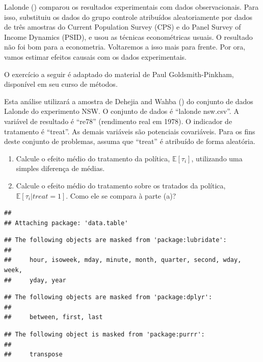 \documentclass[
]{article}
\begin{document}
Lalonde () comparou os resultados experimentais com dados observacionais. Para isso, substituiu os dados do grupo controle atribuídos aleatoriamente por dados de três amostras do Current Population Survey (CPS) e do Panel Survey of Income Dynamics (PSID), e usou as técnicas econométricas usuais. O resultado não foi bom para a econometria. Voltaremos a isso mais para frente. Por ora, vamos estimar efeitos causais com os dados experimentais.

O exercício a seguir é adaptado do material de Paul Goldsmith-Pinkham, disponível em seu curso de métodos.

Esta análise utilizará a amostra de Dehejia and Wahba () do conjunto de dados Lalonde do experimento NSW. O conjunto de dados é ``lalonde nsw.csv''. A variável de resultado é ``re78'' (rendimento real em 1978). O indicador de tratamento é ``treat''. As demais variáveis são potenciais covariáveis. Para os fins deste conjunto de problemas, assuma que ``treat'' é atribuído de forma aleatória.

\begin{enumerate}
\def\labelenumi{(\alph{enumi})}
\item
  Calcule o efeito médio do tratamento da política, \(\mathbb{E}[\tau_i]\), utilizando uma simples diferença de médias.
\item
  Calcule o efeito médio do tratamento sobre os tratados da política, \(\mathbb{E}[\tau_i|treat=1]\). Como ele se compara à parte (a)?
\end{enumerate}

\begin{verbatim}
## 
## Attaching package: 'data.table'
\end{verbatim}

\begin{verbatim}
## The following objects are masked from 'package:lubridate':
## 
##     hour, isoweek, mday, minute, month, quarter, second, wday, week,
##     yday, year
\end{verbatim}

\begin{verbatim}
## The following objects are masked from 'package:dplyr':
## 
##     between, first, last
\end{verbatim}

\begin{verbatim}
## The following object is masked from 'package:purrr':
## 
##     transpose
\end{verbatim}
\end{document}
